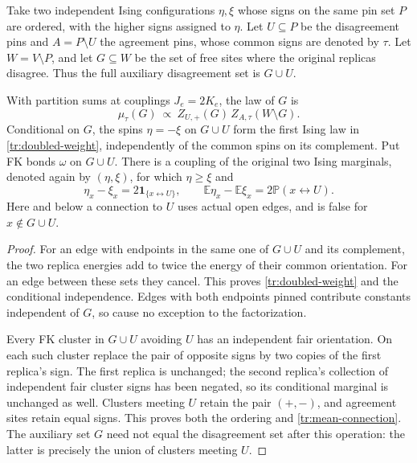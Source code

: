 Take two independent Ising configurations $\eta,\xi$ whose signs on the
same pin set $P$ are ordered, with the higher signs assigned to $\eta$.
Let $U\subseteq P$ be the disagreement pins and $A=P\setminus U$ the
agreement pins, whose common signs are denoted by $\tau$. Let $W=V\setminus
P$, and let $G\subseteq W$ be the set of free sites where the original
replicas disagree. Thus the full auxiliary disagreement set is $G\cup U$.

\begin{lemma}
\label{tr:doubled-coupling}
With partition sums at couplings $J_e=2K_e$, the law of $G$ is
\begin{equation}
\label{tr:doubled-weight}
 \mu_\tau(G)\ \propto\ Z_{U,+}(G)\,Z_{A,\tau}(W\setminus G).
\end{equation}
Conditional on $G$, the spins $\eta=-\xi$ on $G\cup U$ form the first
Ising law in \eqref{tr:doubled-weight}, independently of the common spins
on its complement. Put FK bonds $\omega$ on $G\cup U$. There is a coupling
of the original two Ising marginals, denoted again by $(\eta,\xi)$, for
which $\eta\geq\xi$ and
\begin{equation}
\label{tr:mean-connection}
 \eta_x-\xi_x=2\mathbf1_{\{x\longleftrightarrow U\}},
 \qquad
 \mathbb E\eta_x-\mathbb E\xi_x
 =2\mathbb P(x\longleftrightarrow U).
\end{equation}
Here and below a connection to $U$ uses actual open edges, and is false for
$x\notin G\cup U$.
\end{lemma}

\begin{proof}
For an edge with endpoints in the same one of $G\cup U$ and its complement,
the two replica energies add to twice the energy of their common
orientation. For an edge between these sets they cancel. This proves
\eqref{tr:doubled-weight} and the conditional independence. Edges with
both endpoints pinned contribute constants independent of $G$, so cause
no exception to the factorization.

Every FK cluster in $G\cup U$ avoiding $U$ has an independent fair
orientation. On each such cluster replace the pair of opposite signs by
two copies of the first replica's sign. The first replica is unchanged;
the second replica's collection of independent fair cluster signs has been
negated, so its conditional marginal is unchanged as well. Clusters
meeting $U$ retain the pair $(+,-)$, and agreement sites retain equal
signs. This proves both the ordering and \eqref{tr:mean-connection}.
The auxiliary set $G$ need not equal the disagreement set after this
operation: the latter is precisely the union of clusters meeting $U$.
\end{proof}

